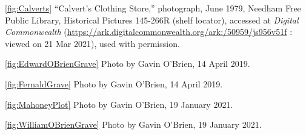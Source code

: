 \ref{fig:Calverts} ``Calvert's Clothing Store,'' photograph, June 1979, Needham Free Public Library, Historical Pictures 145-266R (shelf locator), accessed at \textit{Digital Commonwealth} (\url{https://ark.digitalcommonwealth.org/ark:/50959/js956v51f} : viewed on 21 Mar 2021), used with permission.

\ref{fig:EdwardOBrienGrave} Photo by Gavin O'Brien, 14 April 2019.

\ref{fig:FernaldGrave} Photo by Gavin O'Brien, 14 April 2019.

\ref{fig:MahoneyPlot} Photo by Gavin O'Brien, 19 January 2021.

\ref{fig:WilliamOBrienGrave} Photo by Gavin O'Brien, 19 January 2021.